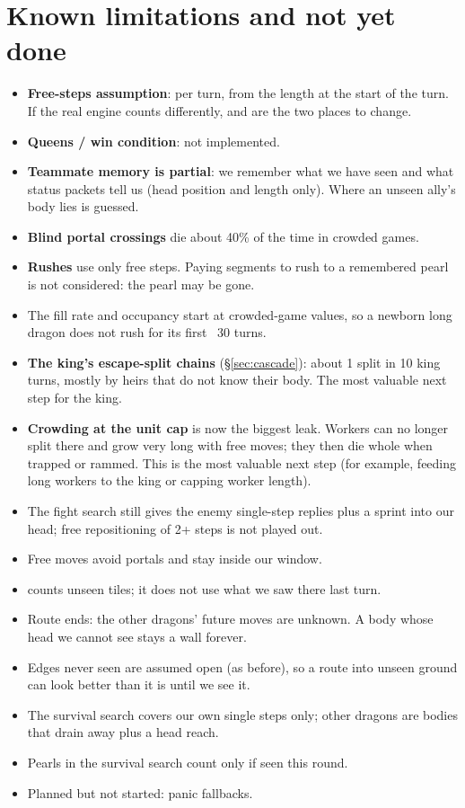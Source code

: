 \documentclass[11pt,a4paper]{article}
\newcommand{\code}[1]{\texttt{\detokenize{#1}}}
\begin{document}
\section{Known limitations and not yet done}
\begin{itemize}
      \item \textbf{Free-steps assumption}: per turn, from the length at the start of the turn. If the real engine counts differently,
            \code{free_moves} and \code{engine.py} are the two places to change.
      \item \textbf{Queens / win condition}: not implemented.
      \item \textbf{Teammate memory is partial}: we remember what we have seen and what status packets tell us (head position and
            length only). Where an unseen ally's body lies is guessed.
      \item \textbf{Blind portal crossings} die about 40\% of the time in crowded games.
      \item \textbf{Rushes} use only free steps. Paying segments to rush to a remembered pearl is not considered: the pearl may be gone.
      \item The fill rate and occupancy start at crowded-game values, so a newborn long dragon does not rush for its first ~30 turns.
      \item \textbf{The king's escape-split chains} (\S\ref{sec:cascade}): about 1 split in 10 king turns, mostly by heirs
            that do not know their body. The most valuable next step for the king.
      \item \textbf{Crowding at the unit cap} is now the biggest leak. Workers can no longer split there and grow very long with free moves;
            they then die whole when trapped or rammed. This is the most valuable next step (for example, feeding long workers to the king
            or capping worker length).
      \item The fight search still gives the enemy single-step replies plus a sprint into our head; free repositioning of 2+ steps is not played out.
      \item Free moves avoid portals and stay inside our window.
      \item \code{unseen_risk} counts unseen tiles; it does not use what we saw there last turn.
      \item Route ends: the other dragons' future moves are unknown. A body whose head we cannot see stays a wall forever.
      \item Edges never seen are assumed open (as before), so a route into unseen ground can look better than it is until we see it.
      \item The survival search covers our own single steps only; other dragons are bodies that drain away plus a head reach.
      \item Pearls in the survival search count only if seen this round.
      \item Planned but not started: panic fallbacks.
\end{itemize}
\end{document}
